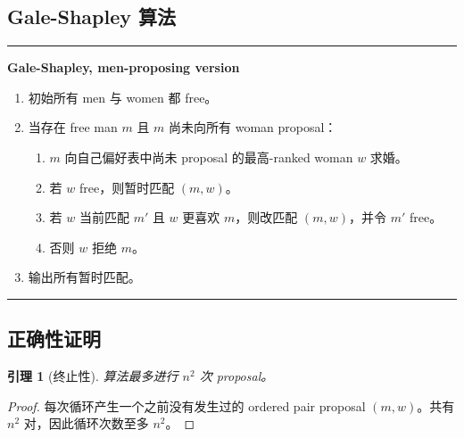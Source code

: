 \documentclass[UTF8,a4paper,11pt]{ctexart}
\newtheorem{lemma}[theorem]{引理}
\newenvironment{algobox}[1]
{\par\medskip\noindent\begin{minipage}{0.96\linewidth}\hrule\vspace{0.35em}\textbf{#1}\par\vspace{0.25em}\small}
{\par\vspace{0.25em}\hrule\end{minipage}\par\medskip}
\begin{document}
\subsection{Gale-Shapley 算法}

\begin{algobox}{Gale-Shapley, men-proposing version}
\begin{enumerate}
  \item 初始所有 men 与 women 都 free。
  \item 当存在 free man $m$ 且 $m$ 尚未向所有 woman proposal：
  \begin{enumerate}
    \item $m$ 向自己偏好表中尚未 proposal 的最高-ranked woman $w$ 求婚。
    \item 若 $w$ free，则暂时匹配 $(m,w)$。
    \item 若 $w$ 当前匹配 $m'$ 且 $w$ 更喜欢 $m$，则改匹配 $(m,w)$，并令 $m'$ free。
    \item 否则 $w$ 拒绝 $m$。
  \end{enumerate}
  \item 输出所有暂时匹配。
\end{enumerate}
\end{algobox}

\begin{center}
\end{center}

\subsection{正确性证明}

\begin{lemma}[终止性]
算法最多进行 $n^2$ 次 proposal。
\end{lemma}
\begin{proof}
每次循环产生一个之前没有发生过的 ordered pair proposal $(m,w)$。共有 $n^2$ 对，因此循环次数至多 $n^2$。
\end{proof}
\end{document}
